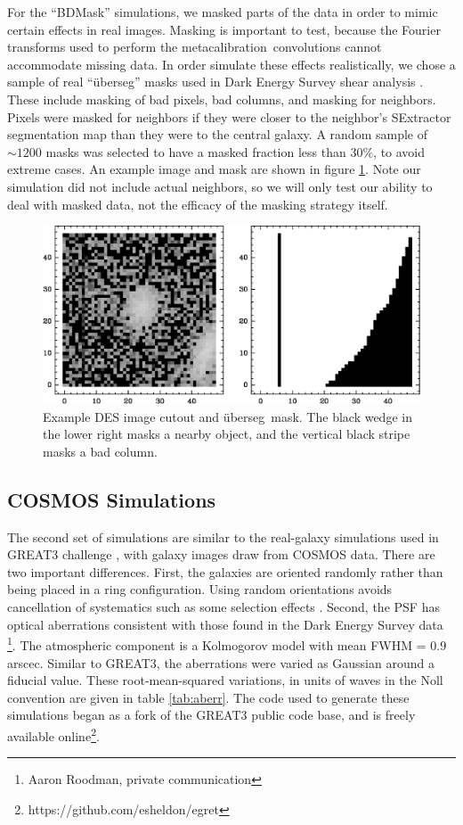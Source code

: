 \documentclass[usegraphicx,usenatbib]{mn2e}
\newcommand{\uberseg}{{\"u}berseg}
\newcommand{\mcal}{metacalibration}
\begin{document}
For the ``BDMask'' simulations, we masked parts of the data in order to mimic
certain effects in real images. Masking is important to test, because the
Fourier transforms used to perform the \mcal\ convolutions cannot accommodate
missing data.  In order simulate these effects realistically, we chose a sample
of real ``\uberseg'' masks used in Dark Energy Survey shear analysis
\citep{DESSVShear}.  These include masking of bad pixels, bad columns, and
masking for neighbors.  Pixels were masked for neighbors if they were closer to
the neighbor's SExtractor \citep{Bertin96} segmentation map than they were to
the central galaxy.  A random sample of $\sim 1200$ masks was selected to have
a masked fraction less than 30\%, to avoid extreme cases.  An example image and
mask are shown in figure \ref{fig:mask}.  Note our simulation did not include
actual neighbors, so we will only test our ability to deal with masked data,
not the efficacy of the masking strategy itself.

\begin{figure}
    \centering
    \includegraphics[scale=0.45]{DES0508-5540-uberseg-013916.eps}

    \caption{Example DES image cutout and \uberseg\ mask.  The black wedge in
the lower right masks a nearby object, and the vertical black stripe masks a
bad column. }

\label{fig:mask}
\end{figure}


\subsection{COSMOS Simulations}

The second set of simulations are similar to the real-galaxy simulations used
in GREAT3 challenge \citep{great3}, with galaxy images draw from
COSMOS data.  There are two important differences.
First, the galaxies are oriented randomly rather than being placed in a ring
configuration.  Using random orientations avoids cancellation of systematics such as
some selection effects \citep{DESSVShear}.  Second, the PSF has optical aberrations consistent with
those found in the Dark Energy Survey data \footnote{Aaron Roodman, private
communication}.  The atmospheric component is a Kolmogorov model with mean FWHM =
0.9 arscec.  Similar to GREAT3, the aberrations were varied as Gaussian around
a fiducial value. These root-mean-squared variations, in units of waves in the
Noll convention are given in table \ref{tab:aberr}.  The code used to generate
these simulations began as a fork of the GREAT3 public code base, and is freely
available online\footnote{https://github.com/esheldon/egret}.
\end{document}
